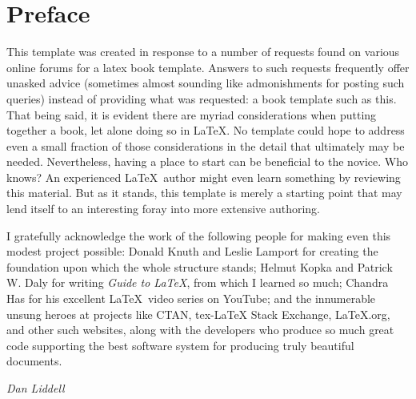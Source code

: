 
\thispagestyle{plain}	

\chapter{Preface}

This template was created in response to a number of requests found on various online forums for a \gls{latex} book template. Answers to such requests frequently offer unasked advice (sometimes almost sounding like admonishments for posting such queries) instead of providing  what was requested: a book template such as this. That being said, it is evident there are myriad considerations when putting together a book, let alone doing so in \LaTeX. No template could hope to address even a small fraction of those considerations in the detail that ultimately may be needed. Nevertheless, having a place to start can be beneficial to the novice. Who knows? An experienced \LaTeX\ author might even learn something by reviewing this material. But as it stands, this template is merely a starting point that may lend itself to an interesting foray into more extensive authoring. \vspace{3\parsep}

I gratefully acknowledge the work of the following people for making even this modest project possible:  Donald Knuth and  Leslie Lamport for creating the foundation upon which the whole structure stands; Helmut Kopka and Patrick W. Daly for writing {\itshape Guide to \LaTeX}, from which I learned so much; Chandra Has for his excellent \LaTeX\ video series on YouTube; and the innumerable unsung heroes at projects like CTAN, \gls{tex}-LaTeX Stack Exchange, LaTeX.org, and other such websites, along with the developers who produce so much great code supporting the best software system for producing truly beautiful documents.

\vspace{0.75in}\hspace{4in}\textit{Dan Liddell}